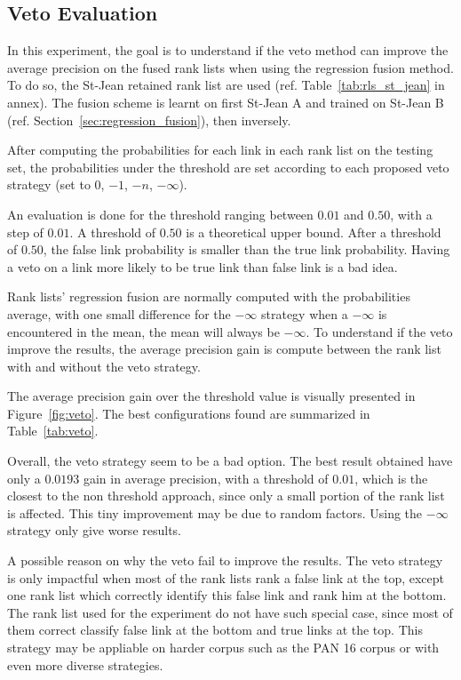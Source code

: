 \subsection{Veto Evaluation}

In this experiment, the goal is to understand if the veto method can improve the average precision on the fused rank lists when using the regression fusion method.
To do so, the St-Jean retained rank list are used (ref. Table~\ref{tab:rls_st_jean} in annex).
The fusion scheme is learnt on first St-Jean A and trained on St-Jean B (ref. Section~\ref{sec:regression_fusion}), then inversely.

After computing the probabilities for each link in each rank list on the testing set, the probabilities under the threshold are set according to each proposed veto strategy (set to $0$, $-1$, $-n$, $-\infty$).

An evaluation is done for the threshold ranging between $0.01$ and $0.50$, with a step of $0.01$.
A threshold of $0.50$ is a theoretical upper bound.
After a threshold of $0.50$, the false link probability is smaller than the true link probability.
Having a veto on a link more likely to be true link than false link is a bad idea.

Rank lists' regression fusion are normally computed with the probabilities average, with one small difference for the $-\infty$ strategy when a $-\infty$ is encountered in the mean, the mean will always be $-\infty$.
To understand if the veto improve the results, the average precision gain is compute between the rank list with and without the veto strategy.

The average precision gain over the threshold value is visually presented in Figure~\ref{fig:veto}.
The best configurations found are summarized in Table~\ref{tab:veto}.

Overall, the veto strategy seem to be a bad option.
The best result obtained have only a $0.0193$ gain in average precision, with a threshold of $0.01$, which is the closest to the non threshold approach, since only a small portion of the rank list is affected.
This tiny improvement may be due to random factors.
Using the $-\infty$ strategy only give worse results.

A possible reason on why the veto fail to improve the results.
The veto strategy is only impactful when most of the rank lists rank a false link at the top, except one rank list which correctly identify this false link and rank him at the bottom.
The rank list used for the experiment do not have such special case, since most of them correct classify false link at the bottom and true links at the top.
This strategy may be appliable on harder corpus such as the PAN 16 corpus or with even more diverse strategies.

